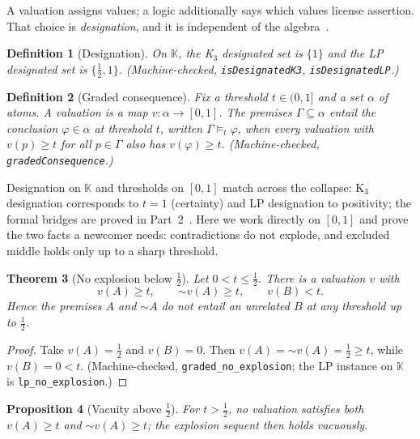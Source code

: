 \documentclass[11pt,a4paper]{article}
\newtheorem{theorem}{Theorem}[section]
\newtheorem{proposition}[theorem]{Proposition}
\newtheorem{definition}[theorem]{Definition}
\newcommand{\negc}{\mathord{\sim}}
\newcommand{\Kl}{\mathbb{K}}
\begin{document}
A valuation assigns values; a logic additionally says which values
license assertion.
That choice is \emph{designation}, and it is independent of the
algebra~\cite{belnap1977,priest2008}.

\begin{definition}[Designation]
\label{def:designation}
On $\Kl$, the \emph{K$_3$ designated set} is $\{1\}$ and the
\emph{LP designated set} is $\{\tfrac{1}{2}, 1\}$.
(Machine-checked, \texttt{isDesignatedK3},
\texttt{isDesignatedLP}.)
\end{definition}

\begin{definition}[Graded consequence]
\label{def:graded}
Fix a threshold $t \in (0,1]$ and a set $\alpha$ of atoms.
A \emph{valuation} is a map $v : \alpha \to [0,1]$.
The premises $\Gamma \subseteq \alpha$ \emph{entail} the conclusion
$\varphi \in \alpha$ at threshold $t$, written
$\Gamma \vDash_t \varphi$, when every valuation with $v(p) \geq t$
for all $p \in \Gamma$ also has $v(\varphi) \geq t$.
(Machine-checked, \texttt{gradedConsequence}.)
\end{definition}

Designation on $\Kl$ and thresholds on $[0,1]$ match across the
collapse: K$_3$ designation corresponds to $t = 1$ (certainty) and
LP designation to positivity; the formal bridges are proved in
Part~2~\cite{part2}.
Here we work directly on $[0,1]$ and prove the two facts a newcomer
needs: contradictions do not explode, and excluded middle holds only
up to a sharp threshold.

\begin{theorem}[No explosion below $\tfrac{1}{2}$]
\label{thm:no-explosion}
Let $0 < t \leq \tfrac{1}{2}$.
There is a valuation $v$ with
\[
v(A) \geq t,
\qquad
\negc v(A) \geq t,
\qquad
v(B) < t.
\]
Hence the premises $A$ and $\negc A$ do not entail an unrelated $B$
at any threshold up to $\tfrac{1}{2}$.
\end{theorem}

\begin{proof}
Take $v(A) = \tfrac{1}{2}$ and $v(B) = 0$.
Then $v(A) = \negc v(A) = \tfrac{1}{2} \geq t$, while
$v(B) = 0 < t$.
(Machine-checked, \texttt{graded\_no\_explosion}; the LP instance on
$\Kl$ is \texttt{lp\_no\_explosion}.)
\end{proof}

\begin{proposition}[Vacuity above $\tfrac{1}{2}$]
\label{prop:vacuity}
For $t > \tfrac{1}{2}$, no valuation satisfies both $v(A) \geq t$ and
$\negc v(A) \geq t$; the explosion sequent then holds vacuously.
\end{proposition}
\end{document}
